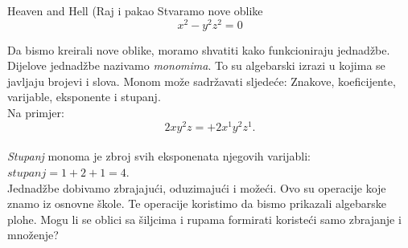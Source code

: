 \begin{surferPage}{Heaven and Hell (Raj i pakao}
Stvaramo nove oblike\\
\smallskip
\[x^2	- y^2z^2	= 0\]

\singlespacing
Da bismo kreirali nove oblike, moramo shvatiti kako funkcioniraju jednad\v{z}be. Dijelove jednad\v{z}be nazivamo {\it monomima}. To su algebarski izrazi u kojima se javljaju brojevi i slova.
\singlespacing
Monom mo\v{z}e sadr\v{z}avati sljede\'{c}e:
Znakove, koeficijente, varijable, eksponente i stupanj.\\
\singlespacing
Na primjer:
\smallskip
\[2xy^2z = +2x^1y^2z^1.\]
\\
\smallskip
{\it Stupanj} monoma je zbroj svih eksponenata njegovih varijabli: $stupanj = 1+2+1=4$.\\
\singlespacing
Jednad\v{z}be dobivamo zbrajaju\'{c}i, oduzimaju\'{c}i i mo\v{z}e\'{c}i. Ovo su operacije koje znamo iz osnovne \v{s}kole. Te operacije koristimo da bismo prikazali algebarske plohe.
\singlespacing
Mogu li se oblici sa \v{s}iljcima i rupama formirati koriste\'{c}i samo zbrajanje i mno\v{z}enje?
\end{surferPage}
